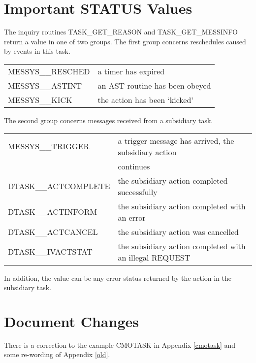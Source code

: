 \section{Important STATUS Values}

The inquiry routines
TASK\_GET\_REASON and TASK\_GET\_MESSINFO return a value in one of two groups. 
The first group concerns reschedules caused by events in this task.

\begin{center}
\begin{tabular}{ll}
MESSYS\_\_RESCHED  & a timer has expired \\
MESSYS\_\_ASTINT   & an AST routine has been obeyed \\
MESSYS\_\_KICK     & the action has been `kicked' \\
\end{tabular}
\end{center}

The second group concerns messages received from a subsidiary task.

\begin{center}
\begin{tabular}{ll}
MESSYS\_\_TRIGGER    &  a trigger message has arrived, the subsidiary action \\
                     &  continues \\
DTASK\_\_ACTCOMPLETE &  the subsidiary action completed successfully \\
DTASK\_\_ACTINFORM   &  the subsidiary action completed with an error \\
DTASK\_\_ACTCANCEL   &  the subsidiary action was cancelled \\
DTASK\_\_IVACTSTAT   &  the subsidiary action completed with an illegal 
REQUEST \\
\end{tabular}
\end{center}

In addition, the value can be any error status returned by the action 
in the subsidiary task.

\section{Document Changes}
There is a correction to the example CMOTASK in Appendix \ref{cmotask} and some
re-wording of Appendix \ref{old}.


